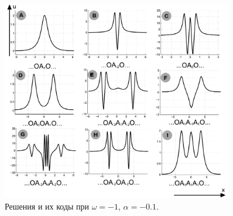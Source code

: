 \documentclass [10pt] {beamer}
\begin{document}
\begin{frame}	
	\begin{figure}
		\includegraphics[width=0.9\textwidth]{pic/classification.pdf}
		\caption{Решения и их коды при $\omega = -1$, $\alpha = -0.1$.}
		\label{pic:classification}
	\end{figure}
\end{frame}
\end{document}

